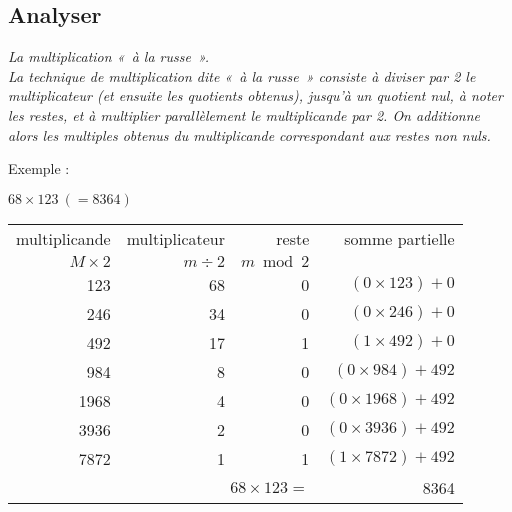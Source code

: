 \subsection{Analyser}\label{sub:analyser}
\begin{td}\label{td:russe}\em La multiplication «~à la russe~».\\
La technique de multiplication dite «~à la rus\-se~» consiste à diviser par 
2 le multiplicateur (et ensuite les quotients obtenus), 
jusqu'à un quotient nul, à noter les restes,
et à multiplier parallèlement le multiplicande par 2. 
On additionne alors les multiples obtenus du multiplicande 
correspondant aux restes non nuls.

\noindent Exemple : \begin{minipage}[t]{10cm}
$68 \times 123\ (= 8364)$\\
\begin{tabular}{|r|r|r|r|}
\hline
multiplicande & multiplicateur & reste      & somme partielle\\
$M \times 2$  & $m \div 2$     & $m \bmod 2$ &       \\
\hline
123  & 68 &   0   &   $(0\times 123) + 0$ \\
246  & 34 &   0   &   $(0\times 246) + 0$ \\
492  & 17 &   1   &   $(1\times 492) + 0$ \\
984  &  8 &   0   &   $(0\times 984) + 492$  \\
1968 &  4 &   0   &   $(0\times 1968) + 492$ \\
3936 &  2 &   0   &   $(0\times 3936) + 492$ \\
7872 &  1 &   1   &   $(1\times 7872) + 492$ \\
\hline
\multicolumn{3}{|r|}{$68 \times 123 =$} & 8364\\
\hline
\end{tabular}
\end{minipage}
\end{td}

